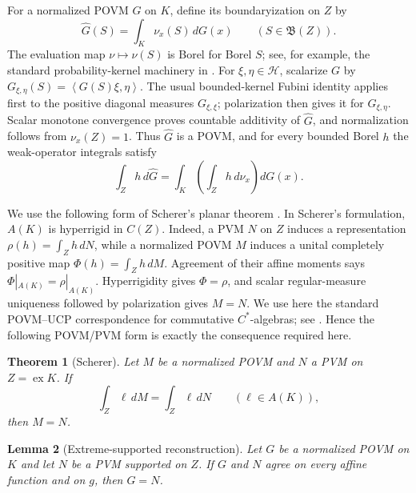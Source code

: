\documentclass[11pt,a4paper]{amsart}
\newtheorem{theorem}{Theorem}[section]
\newtheorem{lemma}[theorem]{Lemma}
\theoremstyle{remark}
\newcommand{\ex}{\operatorname{ex}}
\newcommand{\Borel}{\mathfrak B}
\newcommand{\calH}{\mathcal H}
\newcommand{\inner}[2]{\left\langle #1,#2\right\rangle}
\begin{document}
For a normalized POVM \(G\) on \(K\), define its boundaryization on \(Z\) by
\[
\widehat G(S)=\int_K\nu_x(S)\,dG(x)
 \qquad(S\in\Borel(Z)).                       \tag{3.3}
\]
The evaluation map \(\nu\mapsto\nu(S)\) is Borel for Borel \(S\);
see, for example, the standard probability-kernel machinery in
\cite{Kallenberg}.
For \(\xi,\eta\in\calH\), scalarize \(G\) by
\(G_{\xi,\eta}(S)=\inner{G(S)\xi}{\eta}\).  The usual bounded-kernel Fubini
identity applies first to the positive diagonal measures
\(G_{\xi,\xi}\); polarization then gives it for
\(G_{\xi,\eta}\).  Scalar monotone convergence proves countable additivity
of \(\widehat G\), and normalization follows from
\(\nu_x(Z)=1\).  Thus \(\widehat G\) is a POVM, and for every bounded Borel
\(h\) the weak-operator integrals satisfy
\begin{equation}\label{eq:boundary-fubini}
 \int_Zh\,d\widehat G
 =\int_K\left(\int_Zh\,d\nu_x\right)dG(x).
\end{equation}

We use the following form of Scherer's planar theorem
\cite[Theorem~3.8]{SchererPlanar}.
In Scherer's formulation, \(A(K)\) is hyperrigid in \(C(Z)\).
Indeed, a PVM \(N\) on \(Z\) induces a representation
\(\rho(h)=\int_Zh\,dN\), while a normalized POVM \(M\) induces a unital
completely positive map \(\Phi(h)=\int_Zh\,dM\).  Agreement of their affine
moments says \(\Phi|_{A(K)}=\rho|_{A(K)}\).  Hyperrigidity gives
\(\Phi=\rho\), and scalar regular-measure uniqueness followed by
polarization gives \(M=N\).  We use here the standard POVM--UCP
correspondence for commutative \(C^*\)-algebras; see
\cite{Paulsen}.  Hence the following POVM/PVM form is exactly the
consequence required here.

\begin{theorem}[Scherer]\label{thm:scherer}
Let \(M\) be a normalized POVM and \(N\) a PVM on \(Z=\ex K\).  If
\[
 \int_Z\ell\,dM=\int_Z\ell\,dN\qquad(\ell\in A(K)),
\]
then \(M=N\).
\end{theorem}

\begin{lemma}[Extreme-supported reconstruction]\label{lem:extreme}
Let \(G\) be a normalized POVM on \(K\) and let \(N\) be a PVM supported on
\(Z\).  If \(G\) and \(N\) agree on every affine function and on \(g\), then
\(G=N\).
\end{lemma}
\end{document}
